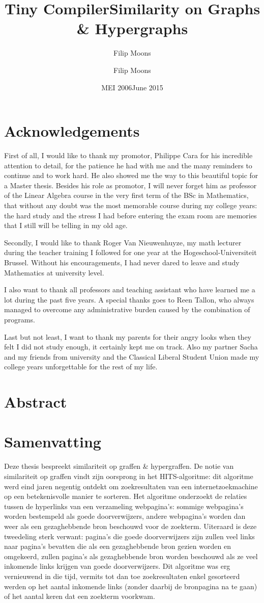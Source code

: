 \documentclass[a4paper,11pt]{report}
\author{Filip Moons}
\title{Tiny Compiler}
\author{Filip Moons}
\title{Similarity on Graphs \& Hypergraphs}
\date{MEI 2006}
\date{June 2015}
\begin{document}
\maketitlepage
\chapter*{Acknowledgements}
First of all, I would like to thank my promotor, Philippe Cara for his incredible attention to detail, 
for the patience he had with me and the many reminders to continue and to work 
hard. He also showed me the way to this beautiful topic for a Master thesis. Besides his role as 
promotor, I will never forget him as professor of the Linear Algebra course in 
the very first term of the BSc in Mathematics, that without any doubt was the 
most memorable course during my college years: the hard study and the stress I 
had before entering the exam room are memories that I still will be telling in my old age.

Secondly, I would like to thank Roger Van Nieuwenhuyze, my math lecturer during 
the teacher training I followed for one year at the Hogeschool-Universiteit Brussel. Without his encouragements, I had never dared to leave
and study Mathematics at university level. 

I also want to thank all professors and teaching assistant who have learned me a 
lot during the past five years. A special thanks goes to Reen Tallon, who 
always managed to overcome any administrative burden caused by the combination 
of programs.

Last but not least, I want to thank my parents for their angry looks when they 
felt I did not study enough, it certainly kept me on track. Also my partner Sacha and my friends from university and the Classical Liberal Student  
Union made my college years unforgettable for the rest of my life.


 
\chapter*{Abstract}


\chapter*{Samenvatting}
Deze thesis bespreekt similariteit op graffen \& hypergraffen. De notie van 
similariteit op graffen vindt zijn oorsprong in het HITS-algoritme: dit algoritme 
werd eind jaren negentig ontdekt om zoekresultaten van een internetzoekmachine op een betekenisvolle manier 
te sorteren. Het algoritme onderzoekt de relaties tussen de hyperlinks van een verzameling webpagina's: sommige webpagina's worden 
bestempeld als goede doorverwijzers, andere webpagina's worden dan weer als een gezaghebbende bron beschouwd voor de zoekterm. 
Uiteraard is deze tweedeling sterk verwant: pagina's die goede doorverwijzers 
zijn zullen veel links naar pagina's bevatten die als een gezaghebbende bron 
gezien worden en omgekeerd, zullen pagina's als gezaghebbende bron worden 
beschouwd als ze veel inkomende links krijgen van goede doorverwijzers. Dit 
algoritme was erg vernieuwend in die tijd, vermits tot dan toe zoekresultaten 
enkel gesorteerd werden op het aantal inkomende links (zonder daarbij de bronpagina na te gaan) 
of het aantal keren dat een zoekterm voorkwam.
\end{document}
